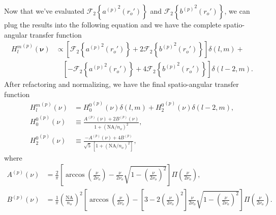 \documentclass[11pt]{article}
\providecommand{\bs}[1]{\boldsymbol{#1}}
\begin{document}
Now that we've evaluated $\mathcal{F}_2\left\{{a^{(p)}}^2(r_o')\right\}$ and $\mathcal{F}_2\left\{{b^{(p)}}^2(r_o')\right\}$, we can plug the results into the following equation and we have the complete spatio-angular transfer function
\begin{align}
  {H_l^m}^{(p)}(\bs{\nu}) &\propto \left[\mathcal{F}_2\left\{{a^{(p)}}^2(r_o')\right\} + 2\mathcal{F}_2\left\{{b^{(p)}}^2(r_o')\right\}\right]\delta(l, m) + \\&\hspace{1em}\left[-\mathcal{F}_2\left\{{a^{(p)}}^2(r_o')\right\} + 4\mathcal{F}_2\left\{{b^{(p)}}^2(r_o')\right\}\right]\delta(l-2, m).
\end{align}
After refactoring and normalizing, we have the final spatio-angular transfer function
\begin{align}
  {H_l^m}^{(p)}(\nu) &= {H_0^0}^{(p)}(\nu)\delta(l, m) + {H_2^0}^{(p)}(\nu)\delta(l-2, m),\\
  {H_0^0}^{(p)}(\nu) &\equiv \frac{A^{(p)}(\nu) + 2B^{(p)}(\nu)}{1 + (\text{NA}/n_o)^2},\\
  {H_2^0}^{(p)}(\nu) &\equiv \frac{-A^{(p)}(\nu) + 4B^{(p)}}{\sqrt{5}\, [1 + (\text{NA}/n_o)^2]},
\end{align}
where
\begin{align}
  {A}^{(p)}(\nu) &= \frac{2}{\pi}\left[\arccos\left(\frac{\nu}{2\nu_o}\right) - \frac{\nu}{2\nu_o}\sqrt{1 - \left(\frac{\nu}{2\nu_o}\right)^2}\right]\Pi\left(\frac{\nu}{2\nu_o}\right),\\
  B^{(p)}(\nu) &= \frac{1}{\pi}\left(\frac{\text{NA}}{n_o}\right)^2\left[\arccos\left(\frac{\nu}{2\nu_o}\right) - \left[3 - 2\left(\frac{\nu}{2\nu_o}\right)^2\right]\frac{\nu}{2\nu_o} \sqrt{1 - \left(\frac{\nu}{2\nu_o}\right)^2}\right]\Pi\left(\frac{\nu}{2\nu_o}\right).                 
\end{align}
\end{document}
